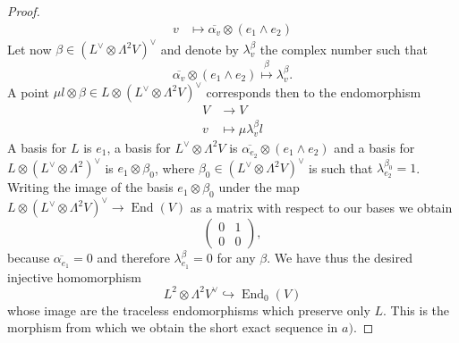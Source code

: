 \documentclass[A4paper, 12pt, british, reqno]{amsart}
\DeclareMathOperator{\End}{End}
\newcommand{\ot}{\otimes}
\newcommand{\dual}{^{\vee}}
\newcommand{\1}{\mathbbm{1}}
\begin{document}
\begin{lm}
\begin{proof}
\begin{align*}
	    v &\longmapsto \overline{\alpha_{v}}\ot (e_{1}\wedge e_{2})
	\end{align*}
	Let now $\beta\in (L\dual \ot \Lambda^{2}V)\dual$ and denote by $\lambda_{v}^{\beta}$ the complex number such that
	\[ \overline{\alpha_{v}}\ot (e_{1}\wedge e_{2})\overset{\beta}{\longmapsto} \lambda_{v}^{\beta}. \]
	A point $\mu l\ot \beta\in L\ot (L\dual\ot \Lambda^{2}V)\dual$ corresponds then to the endomorphism
	\begin{align*}
	    V &\longrightarrow V \\
	    v &\longmapsto \mu \lambda_{v}^{\beta}l
	\end{align*}
	A basis for $L$ is $e_{1}$, a basis for $L\dual \ot \Lambda^{2}V$ is $\overline{\alpha_{e_{2}}}\ot (e_{1}\wedge e_{2})$ and a basis for $L\ot (L\dual\ot \Lambda^{2})\dual$ is $e_{1}\ot \beta_{0}$, where $\beta_{0}\in (L\dual \ot \Lambda^{2}V)\dual$ is such that $\lambda_{e_{2}}^{\beta_{0}}=1$.
	Writing the image of the basis $e_{1}\ot \beta_{0}$ under the map $L\ot (L\dual\ot \Lambda^{2}V)\dual\to \End(V)$ as a matrix with respect to our bases we obtain
	\[
	    \begin{pmatrix}
		0 & 1 \\
		0 & 0
	    \end{pmatrix},
	\]
	because $\overline{\alpha_{e_{1}}}=0$ and therefore $\lambda_{e_{1}}^{\beta}=0$ for any $\beta$.
	We have thus the desired injective homomorphism
	\[ L^{2}\ot \Lambda^{2}V\dual\hookrightarrow \End_{0}(V) \]
	whose image are the traceless endomorphisms which preserve only $L$.
	This is the morphism from which we obtain the short exact sequence in $a)$.


\end{proof}
\end{lm}
\end{document}
